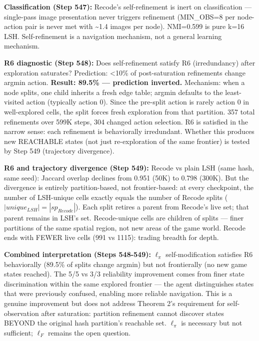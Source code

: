 \documentclass[
  11pt,
]{article}
\begin{document}
\textbf{Classification (Step 547):} Recode's self-refinement is inert on
classification --- single-pass image presentation never triggers
refinement (MIN\_OBS=8 per node-action pair is never met with
\textasciitilde1.4 images per node). NMI=0.599 is pure k=16 LSH.
Self-refinement is a navigation mechanism, not a general learning
mechanism.

\textbf{R6 diagnostic (Step 548):} Does self-refinement satisfy R6
(irredundancy) after exploration saturates? Prediction: \textless10\% of
post-saturation refinements change argmin action. \textbf{Result: 89.5\%
--- prediction inverted.} Mechanism: when a node splits, one child
inherits a fresh edge table; argmin defaults to the least-visited action
(typically action 0). Since the pre-split action is rarely action 0 in
well-explored cells, the split forces fresh exploration from that
partition. 357 total refinements over 599K steps, 304 changed action
selection. R6 is satisfied in the narrow sense: each refinement is
behaviorally irredundant. Whether this produces new REACHABLE states
(not just re-exploration of the same frontier) is tested by Step 549
(trajectory divergence).

\textbf{R6 and trajectory divergence (Step 549):} Recode vs plain LSH
(same hash, same seed): Jaccard overlap declines from 0.951 (50K) to
0.798 (300K). But the divergence is entirely partition-based, not
frontier-based: at every checkpoint, the number of LSH-unique cells
exactly equals the number of Recode splits
(\(|unique_{LSH}| = |sp_{Recode}|\)). Each split retires a parent from
Recode's live set; that parent remains in LSH's set. Recode-unique cells
are children of splits --- finer partitions of the same spatial region,
not new areas of the game world. Recode ends with FEWER live cells (991
vs 1115): trading breadth for depth.

\textbf{Combined interpretation (Steps 548-549):} \(\ell_\pi\)
self-modification satisfies R6 behaviorally (89.5\% of splits change
argmin) but not frontierally (no new game states reached). The 5/5 vs
3/3 reliability improvement comes from finer state discrimination within
the same explored frontier --- the agent distinguishes states that were
previously confused, enabling more reliable navigation. This is a
genuine improvement but does not address Theorem 2's requirement for
self-observation after saturation: partition refinement cannot discover
states BEYOND the original hash partition's reachable set. \(\ell_\pi\)
is necessary but not sufficient; \(\ell_F\) remains the open question.
\end{document}
